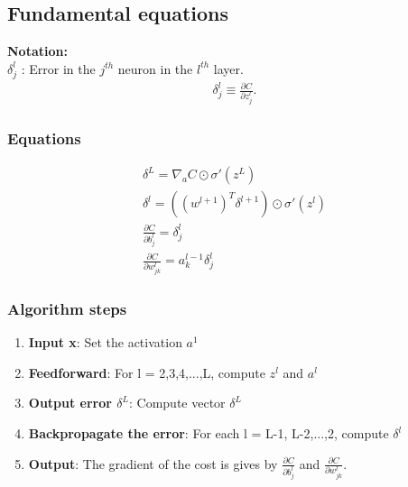 \subsection{Fundamental equations}
\textbf{Notation:}\\
$\delta^l_j$ : Error in the $j^{th}$ neuron in the $l^{th}$ layer.
\begin{eqnarray} 
\delta^l_j \equiv \frac{\partial C}{\partial z^l_j}.
\end{eqnarray}
\subsubsection{Equations}
\begin{eqnarray} 
\delta^L = \nabla_a C \odot \sigma'(z^L)\\
\delta^l = ((w^{l+1})^T \delta^{l+1}) \odot \sigma'(z^l)\\
\frac{\partial C}{\partial b^l_j} = \delta^l_j\\
\frac{\partial C}{\partial w^l_{jk}} = a^{l-1}_k \delta^l_j
\end{eqnarray}

\subsubsection{Algorithm steps}
\begin{enumerate}
\item \textbf{Input x}: Set the activation $a^1$
\item \textbf{Feedforward}: For l = 2,3,4,...,L, compute $z^l$ and $a^l$
\item \textbf{Output error $\delta^L$}: Compute vector $\delta^L$
\item \textbf{Backpropagate the error}: For each l = L-1, L-2,...,2, compute $\delta^l$
\item \textbf{Output}: The gradient of the cost is gives by $\frac{\partial C}{\partial b^l_j}$ and $\frac{\partial C}{\partial w^l_{jk}}$.
\end{enumerate}

